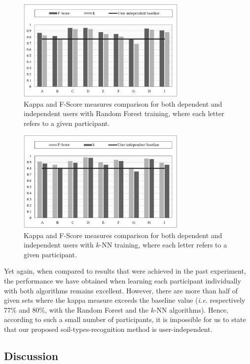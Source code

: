 \documentclass[conference]{IEEEtran}
\begin{document}
\begin{figure}[!t]
  \centering
  \includegraphics[width=3.25in]{user_independent_rf}
  \caption{Kappa and F-Score measures comparison for both dependent and independent users with Random Forest training, where each letter refers to a given participant.}
  \label{fig:user_independent_rf}
\end{figure}

\begin{figure}[!t]
  \includegraphics[width=3.25in]{user_independent_knn}
  \caption{Kappa and F-Score measures comparison for both dependent and independent users with $k$-NN training, where each letter refers to a given participant.}
  \label{fig:user_independent_knn}
\end{figure}

Yet again, when compared to results that were achieved in the past experiment, the performance we have obtained when learning each participant individually with both algorithms remains excellent. However, there are more than half of given sets where the kappa measure exceeds the baseline value (\textit{i.e.} respectively 77\% and 80\%, with the Random Forest and the $k$-NN algorithms). Hence, according to such a small number of participants, it is impossible for us to state that our proposed soil-types-recognition method is user-independent. 

\subsection{Discussion}
\end{document}
